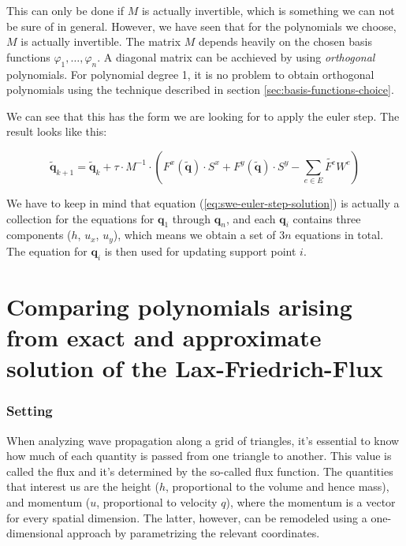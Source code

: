 \documentclass{article}
\renewcommand{\phi}{\varphi}
\begin{document}
This can only be done if $M$ is actually invertible, which is something we can not be sure of in general. However, we have seen that for the polynomials we choose, $M$ is actually invertible. The matrix $M$ depends heavily on the chosen basis functions $\phi_1,\dots,\phi_n$. A diagonal matrix can be acchieved by using \emph{orthogonal} polynomials. For polynomial degree 1, it is no problem to obtain orthogonal polynomials using the technique described in section \ref{sec:basis-functions-choice}.

We can see that this has the form we are looking for to apply the euler step. The result looks like this:

\begin{equation*}
  \label{eq:swe-euler-step-solution}
  \tilde{\mathbf{q}}_{k+1} =
  \tilde{\mathbf{q}}_{k} +
  \tau \cdot M^{-1} \cdot \left(
    F^x(\tilde{\mathbf{q}}) \cdot S^x +
    F^y(\tilde{\mathbf{q}}) \cdot S^y -
    \sum_{e \in E} \tilde{F^e} W^e\right
  )
\end{equation*}

We have to keep in mind that equation (\ref{eq:swe-euler-step-solution}) is actually a collection for the equations for $\mathbf{q}_1$ through $\mathbf{q}_n$, and each $\mathbf{q}_i$ contains three components ($h$, $u_x$, $u_y$), which means we obtain a set of $3n$ equations in total. The equation for $\mathbf{q}_i$ is then used for updating support point $i$.

\part{Comparing polynomials arising from exact and approximate solution of the Lax-Friedrich-Flux}
\label{part:polynomial-comparison}

\section{Setting}
\label{sec:setting}

When analyzing wave propagation along a grid of triangles, it's essential to know how much of each quantity is passed from one triangle to another. This value is called the flux and it's determined by the so-called flux function. The quantities that interest us are the height ($h$, proportional to the volume and hence mass), and momentum ($u$, proportional to velocity $q$), where the momentum is a vector for every spatial dimension. The latter, however, can be remodeled using a one-dimensional approach by parametrizing the relevant coordinates.
\end{document}
